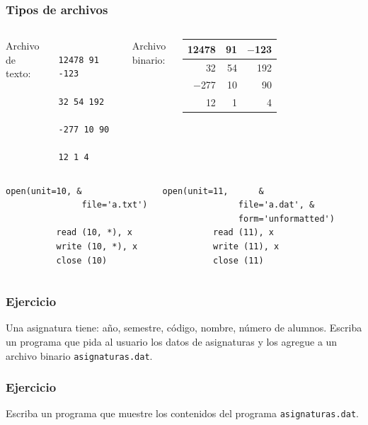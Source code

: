 \documentclass[12pt]{beamer}
\begin{document}
  \begin{frame}[fragile]
    \frametitle{Tipos de archivos}
    \begin{columns}
        Archivo de texto:\vspace{1ex}
        \begin{Verbatim}
          12478 91 -123
          32 54 192
          -277 10 90
          12 1 4
        \end{Verbatim}
        Archivo binario:\vspace{1ex}
        \begin{tabular}{|r|r|r|}\hline
          12478 & 91 & $-$123 \\\hline
             32 & 54 &    192 \\\hline
         $-$277 & 10 &     90 \\\hline
             12 & \phantom{0000}1 & \phantom{0000}4 \\\hline
        \end{tabular}
    \end{columns}
    \pause
    \begin{columns}
        \begin{lstlisting}[gobble=10]
          open(unit=10, &
               file='a.txt')

          read (10, *), x
          write (10, *), x
          close (10)
        \end{lstlisting}
        \begin{lstlisting}[gobble=10]
          open(unit=11,      &
               file='a.dat', &
               form='unformatted')
          read (11), x
          write (11), x
          close (11)
        \end{lstlisting}
    \end{columns}

\end{frame}

  \begin{frame}
    \frametitle{Ejercicio}
    Una asignatura tiene:
    año, semestre, código, nombre, número de alumnos.
    Escriba un programa
    que pida al usuario los datos de asignaturas
    y los agregue a un archivo binario \texttt{asignaturas.dat}.
  \end{frame}

  \begin{frame}
    \frametitle{Ejercicio}
    Escriba un programa que muestre los contenidos
    del programa \texttt{asignaturas.dat}.
  \end{frame}
\end{document}
